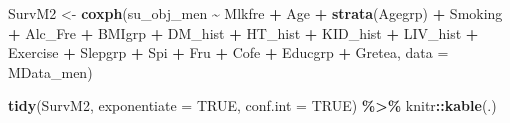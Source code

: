 \documentclass[
]{article}
\newenvironment{Shaded}{\begin{snugshade}}{\end{snugshade}}
\newcommand{\DataTypeTok}[1]{\textcolor[rgb]{0.13,0.29,0.53}{#1}}
\newcommand{\KeywordTok}[1]{\textcolor[rgb]{0.13,0.29,0.53}{\textbf{#1}}}
\newcommand{\NormalTok}[1]{#1}
\newcommand{\OperatorTok}[1]{\textcolor[rgb]{0.81,0.36,0.00}{\textbf{#1}}}
\newcommand{\OtherTok}[1]{\textcolor[rgb]{0.56,0.35,0.01}{#1}}
\newcommand{\StringTok}[1]{\textcolor[rgb]{0.31,0.60,0.02}{#1}}
\begin{document}
\begin{Shaded}
\begin{Highlighting}[]
\NormalTok{SurvM2 \textless{}{-}}\StringTok{  }\KeywordTok{coxph}\NormalTok{(su\_obj\_men }\OperatorTok{\textasciitilde{}}\StringTok{ }\NormalTok{Mlkfre }\OperatorTok{+}\StringTok{ }\NormalTok{Age }\OperatorTok{+}\StringTok{ }\KeywordTok{strata}\NormalTok{(Agegrp) }\OperatorTok{+}\StringTok{ }\NormalTok{Smoking }\OperatorTok{+}\StringTok{ }\NormalTok{Alc\_Fre }\OperatorTok{+}\StringTok{ }
\StringTok{                   }\NormalTok{BMIgrp }\OperatorTok{+}\StringTok{ }\NormalTok{DM\_hist }\OperatorTok{+}\StringTok{ }\NormalTok{HT\_hist }\OperatorTok{+}\StringTok{ }\NormalTok{KID\_hist }\OperatorTok{+}\StringTok{ }\NormalTok{LIV\_hist }\OperatorTok{+}\StringTok{ }\NormalTok{Exercise }\OperatorTok{+}\StringTok{ }
\StringTok{                   }\NormalTok{Slepgrp }\OperatorTok{+}\StringTok{ }\NormalTok{Spi }\OperatorTok{+}\StringTok{ }\NormalTok{Fru }\OperatorTok{+}\StringTok{ }\NormalTok{Cofe }\OperatorTok{+}\StringTok{ }\NormalTok{Educgrp }\OperatorTok{+}\StringTok{ }\NormalTok{Gretea, }
                 \DataTypeTok{data =}\NormalTok{ MData\_men)}

\KeywordTok{tidy}\NormalTok{(SurvM2, }\DataTypeTok{exponentiate =} \OtherTok{TRUE}\NormalTok{, }\DataTypeTok{conf.int =} \OtherTok{TRUE}\NormalTok{) }\OperatorTok{\%\textgreater{}\%}\StringTok{ }
\StringTok{  }\NormalTok{knitr}\OperatorTok{::}\KeywordTok{kable}\NormalTok{(.)}
\end{Highlighting}
\end{Shaded}
\end{document}

